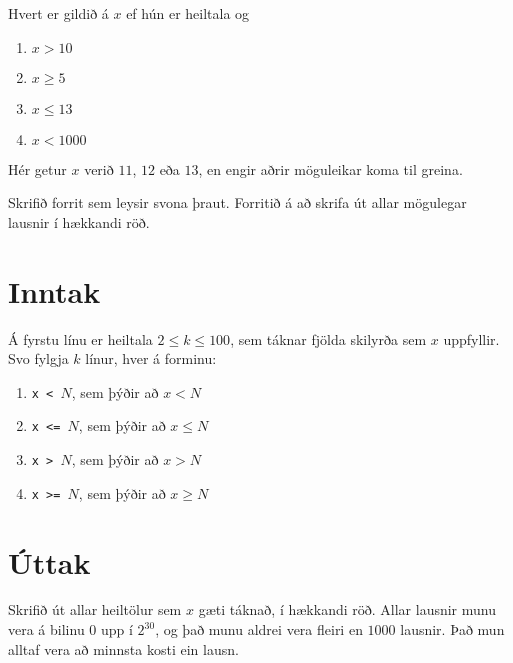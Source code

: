 

Hvert er gildið á $x$ ef hún er heiltala og
\begin{enumerate}
    \item $x > 10$
    \item $x \geq 5$
    \item $x \leq 13$
    \item $x < 1000$
\end{enumerate}
Hér getur $x$ verið $11$, $12$ eða $13$, en engir aðrir möguleikar koma til
greina.

Skrifið forrit sem leysir svona þraut. Forritið á að skrifa út allar mögulegar
lausnir í hækkandi röð.

\section*{Inntak}
Á fyrstu línu er heiltala $2 \leq k \leq 100$, sem táknar fjölda skilyrða sem
$x$ uppfyllir. Svo fylgja $k$ línur, hver á forminu:
\begin{enumerate}
    \item \texttt{x < $N$}, sem þýðir að $x < N$
    \item \texttt{x <= $N$}, sem þýðir að $x \leq N$
    \item \texttt{x > $N$}, sem þýðir að $x > N$
    \item \texttt{x >= $N$}, sem þýðir að $x \geq N$
\end{enumerate}

\section*{Úttak}
Skrifið út allar heiltölur sem $x$ gæti táknað, í hækkandi röð. Allar lausnir
munu vera á bilinu $0$ upp í $2^{30}$, og það munu aldrei vera fleiri en $1000$
lausnir. Það mun alltaf vera að minnsta kosti ein lausn.

